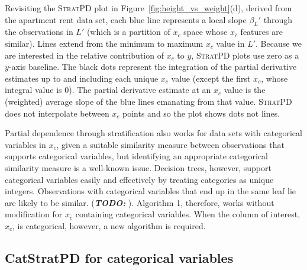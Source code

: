 \documentclass[12pt]{article}
\newcommand{\figref}[1]{Figure~\ref{#1}}
\newcommand{\cut}[1]{}
\newcommand{\todo}[1]{{\bf\em TODO:} {{\color{red}{#1}}}}
\newcommand{\spd}{\fontfamily{cmr}\textsc{\small StratPD}}
\newcommand{\xnc}{$x_{\overline{c}}$}
\begin{document}
\cut{
\spd{} trains a decision tree in the usual way but on $(x_{\overline{c}}, {\bf y})$ rather than $({\bf X}, {\bf y})$. Observations $(X_i, y_i)$ that end up in a tree leaf are, by definition, in the same region of \xnc{} feature space. Training greedily partitions feature space in order to minimize variance of $y_i$ within regions, which partitions feature space into tighter and tighter regions.  (The collection of variable inequality decision nodes along the path from from root to a leaf demarcates the region of feature space.) Tighter regions imply more similar \xnc{} values, which means $x_c$ is likely responsible for any variation in $y$; this likelihood decreases as the size of $L$ increases.  The training process must leave at least two samples per leaf in order to fit a localized linear model.  
}

Revisiting the \spd{} plot in \figref{fig:height_vs_weight}(d), derived from the apartment rent data set, each blue line represents a local slope $\beta_L'$ through the observations in $L'$ (which is a partition of $x_c$ space whose \xnc{} features are similar). Lines extend from the minimum to maximum $x_c$ value in $L'$.  Because we are interested in the relative contribution of $x_c$ to $y$, \spd{} plots use zero as a $y$-axis baseline. The black dots represent the integration of the partial derivative estimates up to and including each unique $x_c$ value (except the first $x_c$, whose integral value is 0). The partial derivative estimate at an $x_c$ value is the (weighted) average slope of the blue lines emanating from that value. \spd{} does not interpolate between $x_c$ points and so the plot shows dots not lines. 

Partial dependence through stratification also works for data sets with categorical variables in \xnc{}, given a suitable similarity measure between observations that supports categorical variables, but identifying an appropriate categorical similarity measure is a well-known issue.  Decision trees, however, support categorical variables easily and effectively by treating categories as unique integers. Observations with categorical variables that end up in the same leaf lie are likely to be similar. (\todo{cite breiman proximity matrix and p595 of ESL book}). Algorithm 1, therefore, works without modification for \xnc{} containing categorical variables. When the column of interest, $x_c$, is categorical, however, a new algorithm is required.

\subsection{CatStratPD for categorical variables}
\end{document}
